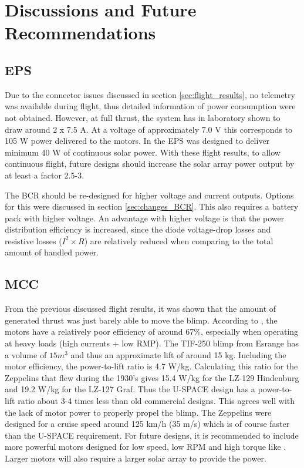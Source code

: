 \section{Discussions and Future Recommendations}
%
\subsection{EPS}
Due to the connector issues discussed in section \ref{sec:flight_results}, no telemetry was available during flight, thus detailed information of power consumption were not obtained. However, at full thrust, the system has in laboratory shown to draw around 2 x 7.5 A. At a voltage of approximately 7.0 V this corresponds to 105 W power delivered to the motors. In \cite{CDR} the \ac{EPS} was designed to deliver minimum 40 W of continuous solar power. With these flight results, to allow continuous flight, future designs should increase the solar array power output by at least a factor 2.5-3.
 
The \ac{BCR} should be re-designed for higher voltage and current outputs. Options for this were discussed in section \ref{sec:changes_BCR}. This also requires a battery pack with higher voltage. An advantage with higher voltage is that the power distribution efficiency is increased, since the diode voltage-drop losses and resistive losses ($I^2 \times R$) are relatively reduced when comparing to the total amount of handled power. 
%
\subsection{MCC}
From the previous discussed flight results, it was shown that the amount of generated thrust was just barely able to move the blimp. According to \cite{website:ModelMotors}, the motors have a relatively poor efficiency of around 67\%, especially when operating at heavy loads (high currents + low \ac{RMP}). The TIF-250 blimp from Esrange has a volume of $15 m^3$ and thus an approximate lift of around 15 kg. Including the motor efficiency, the power-to-lift ratio is 4.7 W/kg. Calculating this ratio for the Zeppelins that flew during the 1930's\cite{website:graf_zeppelin} gives 15.4 W/kg for the LZ-129 Hindenburg and 19.2 W/kg for the LZ-127 Graf. Thus the U-SPACE design has a power-to-lift ratio about 3-4 times less than old commercial designs. This agrees well with the lack of motor power to properly propel the blimp. The Zeppelins were designed for a cruise speed around 125 km/h (35 m/s) which is of course faster than the U-SPACE requirement. For future designs, it is recommended to include more powerful motors designed for low speed, low \ac{RPM} and high torque like \cite{website:ModelMotors_AXI5360}. Larger motors will also require a larger solar array to provide the power.